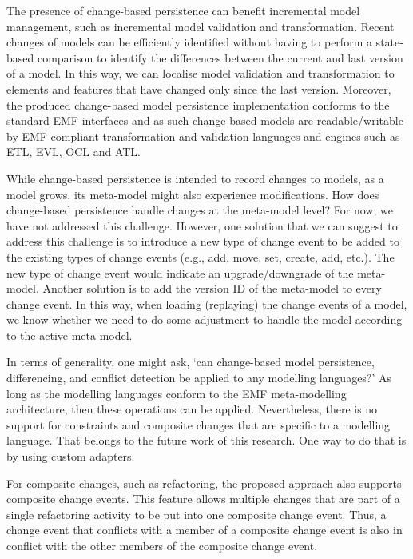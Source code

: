 The presence of change-based persistence can benefit incremental model management, such as incremental model validation and transformation. Recent changes of models can be efficiently identified without having to perform a state-based comparison to identify the differences between the current and last version of a model. In this way, we can localise model validation and transformation to elements and features that have changed only since the last version. Moreover, the produced change-based model persistence implementation conforms to the standard EMF interfaces and as such change-based models are readable/writable by EMF-compliant transformation and validation languages and engines such as ETL, EVL, OCL and ATL.

While change-based persistence is intended to record changes to models, as a model grows, its meta-model might also experience modifications. How does change-based persistence handle changes at the meta-model level? For now, we have not addressed this challenge. However, one solution that we can suggest to address this challenge is to introduce a new type of change event to be added to the existing types of change events (e.g., add, move, set, create, add, etc.). The new type of change event would indicate an upgrade/downgrade of the meta-model. Another solution is to add the version ID of the meta-model to every change event. In this way, when loading (replaying) the change events of a model, we know whether we need to do some adjustment to handle the model according to the active meta-model.

In terms of generality, one might ask, ‘can change-based model persistence, differencing, and conflict detection be applied to any modelling languages?’ As long as the modelling languages conform to the EMF meta-modelling architecture, then these operations can be applied. Nevertheless, there is no support for constraints and composite changes that are specific to a modelling language. That belongs to the future work of this research. One way to do that is by using custom adapters.

For composite changes, such as refactoring, the proposed approach also supports composite change events. This feature allows multiple changes that are part of a single refactoring activity to be put into one composite change event. Thus, a change event that conflicts with a member of a composite change event is also in conflict with the other members of the composite change event.

